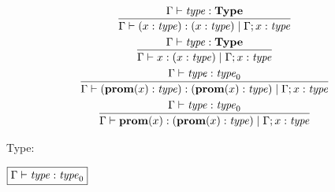 \begin{gather*}
  \infer{\Gamma \vdash (x: \mathit{type}): (x: \mathit{type}) \mid \Gamma; x: \mathit{type}}{
    \Gamma \vdash \mathit{type}: \mathbf{Type}
  }
  \\
  \infer{\Gamma \vdash x: (x: \mathit{type}) \mid \Gamma; x: \mathit{type}}{
    \Gamma \vdash \mathit{type}: \mathbf{Type}
  }
  \\
  \infer{\Gamma \vdash (\mathbf{prom}(x): \mathit{type}): (\mathbf{prom}(x): \mathit{type}) \mid \Gamma; x: \mathit{type}}{
    \Gamma \vdash \mathit{type}: \mathit{type}_0
  }
  \\
  \infer{\Gamma \vdash \mathbf{prom}(x): (\mathbf{prom}(x): \mathit{type}) \mid \Gamma; x: \mathit{type}}{
    \Gamma \vdash \mathit{type}: \mathit{type}_0
  }
\end{gather*}

Type:

$\fbox{$\Gamma \vdash \mathit{type}: \mathit{type}_0$}$


